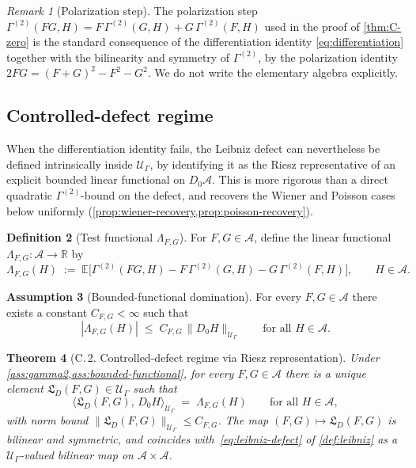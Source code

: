 \documentclass[11pt,reqno]{amsart}
\theoremstyle{plain}
\newtheorem{theorem}{Theorem}[section]
\theoremstyle{definition}
\newtheorem{definition}[theorem]{Definition}
\newtheorem{assumption}[theorem]{Assumption}
\theoremstyle{remark}
\newtheorem{remark}[theorem]{Remark}
\newcommand{\R}{\mathbb{R}}
\newcommand{\E}{\mathbb{E}}
\newcommand{\cA}{\mathcal A}
\newcommand{\cU}{\mathcal U}
\newcommand{\Lleib}{\mathfrak L}
\begin{document}
\begin{remark}[Polarization step]\label{rem:polarization}
The polarization step
$\Gamma^{(2)}(FG,H)=F\,\Gamma^{(2)}(G,H)+G\,\Gamma^{(2)}(F,H)$
used in the proof of \cref{thm:C-zero} is the standard
consequence of the differentiation identity
\eqref{eq:differentiation} together with the bilinearity and
symmetry of $\Gamma^{(2)}$, by the polarization identity
$2FG=(F+G)^{2}-F^{2}-G^{2}$. We do not write the elementary
algebra explicitly.
\end{remark}

\subsection{Controlled-defect regime}\label{sec:leibniz-controlled}

When the differentiation identity fails, the Leibniz defect can
nevertheless be defined intrinsically inside $\cU_{\Gamma}$, by
identifying it as the Riesz representative of an explicit
bounded linear functional on $D_{0}\cA$. This is more rigorous
than a direct quadratic $\Gamma^{(2)}$-bound on the defect, and
recovers the Wiener and Poisson cases below uniformly
(\cref{prop:wiener-recovery,prop:poisson-recovery}).

\begin{definition}[Test functional $\Lambda_{F,G}$]\label{def:Lambda}
For $F,G\in\cA$, define the linear functional
$\Lambda_{F,G}\colon\cA\to\R$ by
\begin{equation}\label{eq:Lambda}
  \Lambda_{F,G}(H)\;:=\;
  \E\!\bigl[\Gamma^{(2)}(FG,H)-F\,\Gamma^{(2)}(G,H)-G\,\Gamma^{(2)}(F,H)\bigr],
  \qquad H\in\cA.
\end{equation}
\end{definition}

\begin{assumption}[Bounded-functional domination]\label{ass:bounded-functional}
For every $F,G\in\cA$ there exists a constant $C_{F,G}<\infty$
such that
\begin{equation}\label{eq:bounded-functional}
  |\Lambda_{F,G}(H)|\;\le\;C_{F,G}\,\|D_{0}H\|_{\cU_{\Gamma}}
  \qquad\text{for all }H\in\cA.
\end{equation}
\end{assumption}

\begin{theorem}[C.\,2. Controlled-defect regime via Riesz representation]\label{thm:C-controlled}
Under \cref{ass:gamma2,ass:bounded-functional}, for every
$F,G\in\cA$ there is a unique element
$\Lleib_{D}(F,G)\in\cU_{\Gamma}$ such that
\begin{equation}\label{eq:Lleib-Riesz}
  \langle\Lleib_{D}(F,G),\,D_{0}H\rangle_{\cU_{\Gamma}}
  \;=\;\Lambda_{F,G}(H)
  \qquad\text{for all }H\in\cA,
\end{equation}
with norm bound $\|\Lleib_{D}(F,G)\|_{\cU_{\Gamma}}\le C_{F,G}$.
The map $(F,G)\mapsto\Lleib_{D}(F,G)$ is bilinear and symmetric,
and coincides with~\eqref{eq:leibniz-defect} of
\cref{def:leibniz} as a $\cU_{\Gamma}$-valued bilinear map on
$\cA\times\cA$.
\end{theorem}
\end{document}
